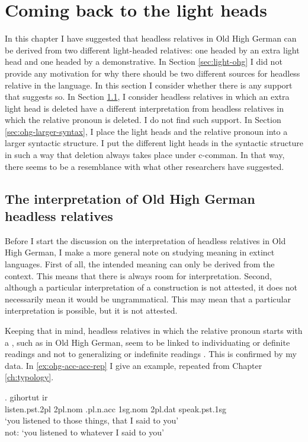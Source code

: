 \section{Coming back to the light heads}\label{sec:coming-back}

In this chapter I have suggested that headless relatives in Old High German can be derived from two different light-headed relatives: one headed by an extra light head and one headed by a demonstrative.
In Section \ref{sec:light-ohg} I did not provide any motivation for why there should be two different sources for headless relative in the language.
In this section I consider whether there is any support that suggests so.
In Section \ref{sec:interpretation-ohg}, I consider headless relatives in which an extra light head is deleted have a different interpretation from headless relatives in which the relative pronoun is deleted. I do not find such support.
In Section \ref{sec:ohg-larger-syntax}, I place the light heads and the relative pronoun into a larger syntactic structure. I put the different light heads in the syntactic structure in such a way that deletion always takes place under c-comman. In that way, there seems to be a resemblance with what other researchers have suggested.

\subsection{The interpretation of Old High German headless relatives}\label{sec:interpretation-ohg}

Before I start the discussion on the interpretation of headless relatives in Old High German, I make a more general note on studying meaning in extinct languages. First of all, the intended meaning can only be derived from the context. This means that there is always room for interpretation. Second, although a particular interpretation of a construction is not attested, it does not necessarily mean it would be ungrammatical. This may mean that a particular interpretation is possible, but it is not attested.

Keeping that in mind, headless relatives in which the relative pronoun starts with a , such as in Old High German, seem to be linked to individuating or definite readings and not to generalizing or indefinite readings \citep[cf.][]{fuss2017}. This is confirmed by my data. In \ref{ex:ohg-acc-acc-rep} I give an example, repeated from Chapter \ref{ch:typology}.

\exg. gihortut ir    \\
 listen.\ac{pst}.2\ac{pl}\scsub{[acc]} 2\ac{pl}.\ac{nom} .\ac{pl}.\ac{n}.\ac{acc} 1\ac{sg}.\ac{nom} 2\ac{pl}.\ac{dat} speak.\ac{pst}.1\ac{sg}\scsub{[acc]}\\
 `you listened to those things, that I said to you'\\
 not: `you listened to whatever I said to you' \label{ex:ohg-acc-acc-rep}

